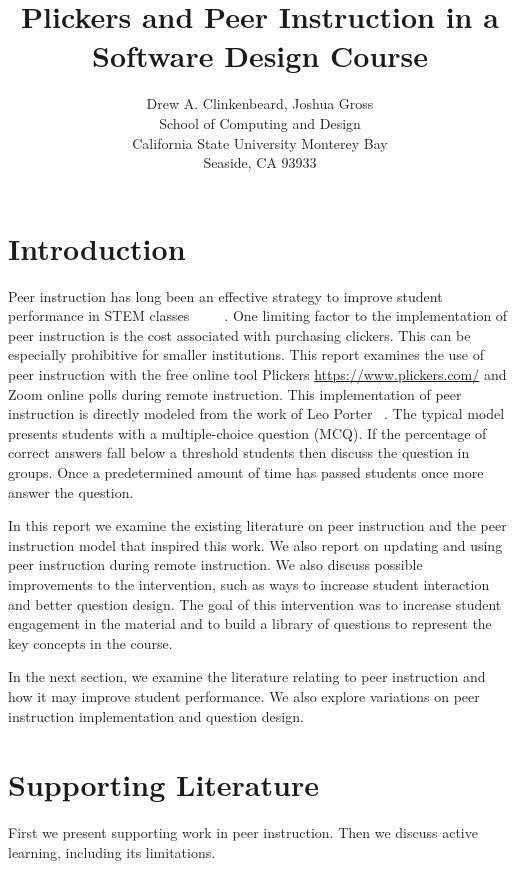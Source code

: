 \documentclass{article}
\title{Plickers and Peer Instruction in a Software Design Course}
\author{Drew A. Clinkenbeard, Joshua Gross\\
  School of Computing and Design\\
  California State University Monterey Bay\\
  Seaside, CA 93933\\
  \email{dclinkenbeard@csumb.edu}
  \email{jgross@csumb.edu}
}
\begin{document}
\maketitle

\begin{abstract}


\end{abstract}

\section{Introduction}
Peer instruction has long been an effective strategy to improve student performance in STEM classes ~\cite{porterMultiinstitutionalStudyPeer2016} ~\cite{porterHalvingFailRates2013} ~\cite{simonExperienceReportPeer2010a}. One limiting factor to the implementation of peer instruction is the cost associated with purchasing clickers.  This can be especially prohibitive for smaller institutions.  
This report examines the use of peer instruction with the free online tool Plickers \url{https://www.plickers.com/} and Zoom online polls during remote instruction.  
This implementation of peer instruction is directly modeled from the work of Leo Porter ~\cite{porterMultiinstitutionalStudyPeer2016}.  The typical model presents students with a multiple-choice question (MCQ). If the percentage of correct answers fall below a threshold students then discuss the question in groups. Once a predetermined amount of time has passed students once more answer the question.

In this report we examine the existing literature on peer instruction and the peer instruction model that inspired this work.  We also report on updating and using peer instruction during remote instruction.  We also discuss possible improvements to the intervention, such as ways to increase student interaction and better question design. The goal of this intervention was to increase student engagement in the material and to build a library of questions to represent the key concepts in the course. 

In the next section, we examine the literature relating to peer instruction and how it may improve student performance.  We also explore variations on peer instruction implementation and question design. 

\section{Supporting Literature}
First we present supporting work in peer instruction.  Then we discuss active learning, including its limitations. 
\end{document}
